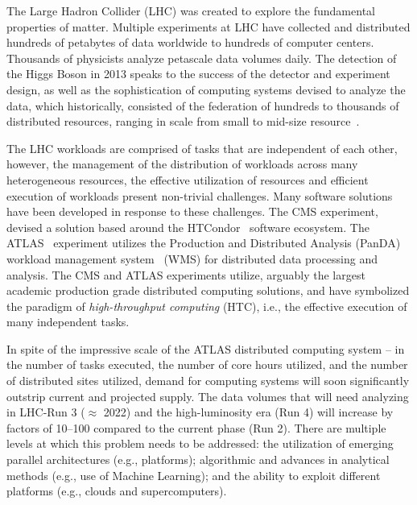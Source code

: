 
The Large Hadron Collider (LHC) was created to explore the fundamental
properties of matter. Multiple experiments at LHC have collected and
distributed hundreds of petabytes of data worldwide to hundreds of computer
centers. Thousands of physicists analyze petascale data volumes daily. The
detection of the Higgs Boson in 2013 speaks to the success of the detector
and experiment design, as well as the sophistication of computing systems
devised to analyze the data, which historically, consisted of the federation
of hundreds to thousands of distributed resources, ranging in scale from
small to mid-size resource~\cite{foster2003grid}.

The LHC workloads are comprised of tasks that are independent of each other,
however, the management of the distribution of workloads across many
heterogeneous resources, the effective utilization of resources and efficient
execution of workloads present non-trivial challenges. Many software
solutions have been developed in response to these challenges. The CMS
experiment, devised a solution based around the
HTCondor~\cite{thain2005distributed} software ecosystem. The
ATLAS~\cite{Aad:2008} experiment utilizes the Production and Distributed
Analysis (PanDA) workload management system~\cite{Maeno2011} (WMS) for
distributed data processing and analysis. The CMS and ATLAS experiments
utilize, arguably the largest academic production grade distributed computing
solutions, and have symbolized the paradigm of {\it high-throughput
computing} (HTC), i.e., the effective execution of many independent tasks.

In spite of the impressive scale of the ATLAS distributed computing system --
in the number of tasks executed, the number of core hours utilized, and the
number of distributed sites utilized,  demand for computing systems will soon
significantly outstrip current and projected supply.   The data volumes that
will need analyzing in LHC-Run 3 ($\approx$ 2022) and the high-luminosity
era (Run 4) will increase by factors of 10--100 compared to the current phase
(Run 2). There are multiple levels at which this problem needs to be
addressed: the utilization of emerging parallel architectures (e.g.,
platforms); algorithmic and advances in analytical methods (e.g., use of
Machine Learning); and the ability to exploit different platforms (e.g.,
clouds and supercomputers).

